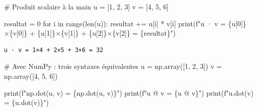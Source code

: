 \documentclass[
  french,
  11pt,
  a4paper,
]{scrbook}
\newenvironment{Shaded}{}{}
\newcommand{\BuiltInTok}[1]{\textcolor[rgb]{0.84,0.23,0.29}{#1}}
\newcommand{\CommentTok}[1]{\textcolor[rgb]{0.42,0.45,0.49}{#1}}
\newcommand{\ControlFlowTok}[1]{\textcolor[rgb]{0.84,0.23,0.29}{#1}}
\newcommand{\DecValTok}[1]{\textcolor[rgb]{0.00,0.36,0.77}{#1}}
\newcommand{\KeywordTok}[1]{\textcolor[rgb]{0.84,0.23,0.29}{#1}}
\newcommand{\NormalTok}[1]{\textcolor[rgb]{0.14,0.16,0.18}{#1}}
\newcommand{\OperatorTok}[1]{\textcolor[rgb]{0.14,0.16,0.18}{#1}}
\newcommand{\SpecialCharTok}[1]{\textcolor[rgb]{0.00,0.36,0.77}{#1}}
\newcommand{\SpecialStringTok}[1]{\textcolor[rgb]{0.01,0.18,0.38}{#1}}
\begin{document}
\begin{Shaded}
\begin{Highlighting}[]
\CommentTok{\# Produit scalaire à la main}
\NormalTok{u }\OperatorTok{=}\NormalTok{ [}\DecValTok{1}\NormalTok{, }\DecValTok{2}\NormalTok{, }\DecValTok{3}\NormalTok{]}
\NormalTok{v }\OperatorTok{=}\NormalTok{ [}\DecValTok{4}\NormalTok{, }\DecValTok{5}\NormalTok{, }\DecValTok{6}\NormalTok{]}

\NormalTok{resultat }\OperatorTok{=} \DecValTok{0}
\ControlFlowTok{for}\NormalTok{ i }\KeywordTok{in} \BuiltInTok{range}\NormalTok{(}\BuiltInTok{len}\NormalTok{(u)):}
\NormalTok{    resultat }\OperatorTok{+=}\NormalTok{ u[i] }\OperatorTok{*}\NormalTok{ v[i]}
\BuiltInTok{print}\NormalTok{(}\SpecialStringTok{f"u · v = }\SpecialCharTok{\{}\NormalTok{u[}\DecValTok{0}\NormalTok{]}\SpecialCharTok{\}}\SpecialStringTok{×}\SpecialCharTok{\{}\NormalTok{v[}\DecValTok{0}\NormalTok{]}\SpecialCharTok{\}}\SpecialStringTok{ + }\SpecialCharTok{\{}\NormalTok{u[}\DecValTok{1}\NormalTok{]}\SpecialCharTok{\}}\SpecialStringTok{×}\SpecialCharTok{\{}\NormalTok{v[}\DecValTok{1}\NormalTok{]}\SpecialCharTok{\}}\SpecialStringTok{ + }\SpecialCharTok{\{}\NormalTok{u[}\DecValTok{2}\NormalTok{]}\SpecialCharTok{\}}\SpecialStringTok{×}\SpecialCharTok{\{}\NormalTok{v[}\DecValTok{2}\NormalTok{]}\SpecialCharTok{\}}\SpecialStringTok{ = }\SpecialCharTok{\{}\NormalTok{resultat}\SpecialCharTok{\}}\SpecialStringTok{"}\NormalTok{)}
\end{Highlighting}
\end{Shaded}

\begin{verbatim}
u · v = 1×4 + 2×5 + 3×6 = 32
\end{verbatim}

\begin{Shaded}
\begin{Highlighting}[]
\CommentTok{\# Avec NumPy : trois syntaxes équivalentes}
\NormalTok{u }\OperatorTok{=}\NormalTok{ np.array([}\DecValTok{1}\NormalTok{, }\DecValTok{2}\NormalTok{, }\DecValTok{3}\NormalTok{])}
\NormalTok{v }\OperatorTok{=}\NormalTok{ np.array([}\DecValTok{4}\NormalTok{, }\DecValTok{5}\NormalTok{, }\DecValTok{6}\NormalTok{])}

\BuiltInTok{print}\NormalTok{(}\SpecialStringTok{f"np.dot(u, v) = }\SpecialCharTok{\{}\NormalTok{np}\SpecialCharTok{.}\NormalTok{dot(u, v)}\SpecialCharTok{\}}\SpecialStringTok{"}\NormalTok{)}
\BuiltInTok{print}\NormalTok{(}\SpecialStringTok{f"u @ v        = }\SpecialCharTok{\{}\NormalTok{u }\OperatorTok{@}\NormalTok{ v}\SpecialCharTok{\}}\SpecialStringTok{"}\NormalTok{)}
\BuiltInTok{print}\NormalTok{(}\SpecialStringTok{f"u.dot(v)     = }\SpecialCharTok{\{}\NormalTok{u}\SpecialCharTok{.}\NormalTok{dot(v)}\SpecialCharTok{\}}\SpecialStringTok{"}\NormalTok{)}
\end{Highlighting}
\end{Shaded}
\end{document}
